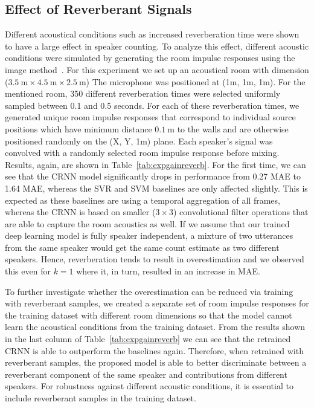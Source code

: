 \subsection{Effect of Reverberant Signals}%
\label{ssec:exp_reverb}
Different acoustical conditions such as increased reverberation time were shown~\cite{Pasha17_reverb} to have a large effect in speaker counting.
To analyze this effect, different acoustic conditions were simulated by generating the room impulse responses using the image method~\cite{allen79, habets16}.
For this experiment we set up an acoustical room with dimension ($3.5~\mbox{m} \times 4.5~\mbox{m} \times 2.5~\mbox{m}$)
The microphone was positioned at (1m, 1m, 1m).
For the mentioned room, 350 different reverberation times were selected uniformly sampled between 0.1 and 0.5 seconds.
For each of these reverberation times, we generated unique room impulse responses that correspond to individual source positions which have minimum distance $0.1~\mbox{m}$ to the walls and are otherwise positioned randomly on the (X, Y, 1m) plane.
Each speaker's signal was convolved with a randomly selected room impulse response before mixing.
Results, again, are shown in Table~\ref{tab:expgainreverb}.
For the first time, we can see that the CRNN model significantly drops in performance from 0.27 MAE to 1.64 MAE, whereas the SVR and SVM baselines are only affected slightly.
This is expected as these baselines are using a temporal aggregation of all frames, whereas the CRNN is based on smaller (\(3 \times 3\)) convolutional filter operations that are able to capture the room acoustics as well.
If we assume that our trained deep learning model is fully speaker independent, a mixture of two utterances from the same speaker would get the same count estimate as two different speakers.
Hence, reverberation tends to result in overestimation and we observed this even for \(k = 1\) where it, in turn, resulted in an increase in MAE.
\par
To further investigate whether the overestimation can be reduced via training with reverberant samples, we created a separate set of room impulse responses for the training dataset with different room dimensions so that the model cannot learn the acoustical conditions from the training dataset.
From the results shown in the last column of Table~\ref{tab:expgainreverb} we can see that the retrained CRNN is able to outperform the baselines again.
Therefore, when retrained with reverberant samples, the proposed model is able to better discriminate between a reverberant component of the same speaker and contributions from different speakers.
For robustness against different acoustic conditions, it is essential to include reverberant samples in the training dataset.

